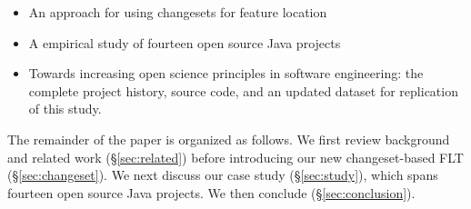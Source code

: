 \begin{itemize} \item An approach for using changesets for feature location
        \item A empirical study of fourteen open source Java projects \item
            Towards increasing open science principles in software engineering:
            the complete project history, source code, and an updated dataset
            for replication of this study.  \end{itemize}

The remainder of the paper is organized as follows.  We first review background
and related work (\S\ref{sec:related}) before introducing our new
changeset-based FLT (\S\ref{sec:changeset}).  We next discuss our case study
(\S\ref{sec:study}), which spans fourteen open source Java projects.  We then
conclude (\S\ref{sec:conclusion}).

